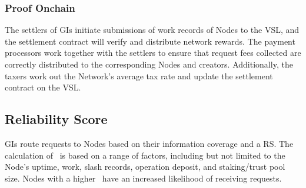 \subsubsection{Proof Onchain} The settlers of \glspl{GI} initiate submissions of work records of \glspl{Node} to the \gls{VSL}, and the settlement contract will verify and distribute network rewards.
The payment processors work together with the settlers to ensure that request fees collected are correctly distributed to the corresponding \glspl{Node} and creators.
Additionally, the taxers work out the Network's average tax rate and update the settlement contract on the \gls{VSL}.

\subsection{Reliability Score}

\glspl{GI} route requests to \glspl{Node} based on their information coverage and a \gls{RS}.
The calculation of \reliabilityScore\ is based on a range of factors, including but not limited to the \gls{Node}'s uptime, work, slash records, operation deposit, and staking/trust pool size.
\glspl{Node} with a higher \reliabilityScore\ have an increased likelihood of receiving requests.
